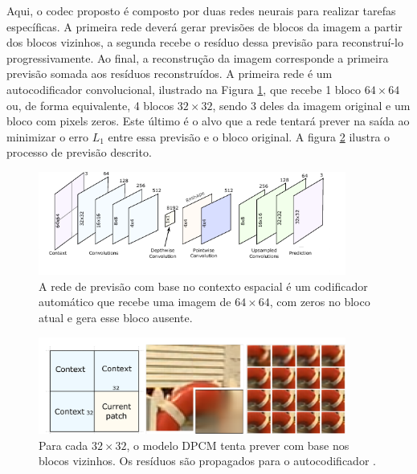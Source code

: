 Aqui, o \acrshort{codec} proposto é composto por duas redes neurais para realizar tarefas específicas. A primeira rede deverá gerar previsões de blocos da imagem a partir dos blocos vizinhos, a segunda recebe o resíduo dessa previsão para reconstruí-lo progressivamente. 
Ao final, a reconstrução da imagem corresponde a primeira previsão somada aos resíduos reconstruídos. A primeira rede é um autocodificador convolucional, ilustrado na Figura \ref{fig:toderici8}, que recebe 1 bloco $64 \times 64$ ou, de forma equivalente, 4 blocos $32 \times 32$, sendo 3 deles da imagem original e um bloco com pixels zeros. Este último é o alvo que a rede tentará prever na saída ao minimizar o erro $L_1$ entre essa previsão e o bloco original.  A figura \ref{fig:toderici7} ilustra o processo de previsão descrito.     


\begin{figure}
	\centering
	\includegraphics[width=0.90\textwidth]{figuras/toderici_8.pdf}
	\caption[Modelo DPCM com autocodificador.]{A rede de previsão com base no contexto espacial é um codificador automático que recebe uma imagem de $64 \times 64$, com zeros no bloco atual e gera esse bloco ausente\cite{SpatiallyAdaptive2018Minnen}.}
	\label{fig:toderici8}
\end{figure}

\begin{figure}
	\centering
	\includegraphics[width=0.90\textwidth]{figuras/toderici_7.pdf}
	\caption[]{Para cada  $32 \times 32$, o modelo DPCM tenta prever com base nos blocos vizinhos. Os resíduos são propagados para o autocodificador \cite{SpatiallyAdaptive2018Minnen}.}
	\label{fig:toderici7}
\end{figure}


